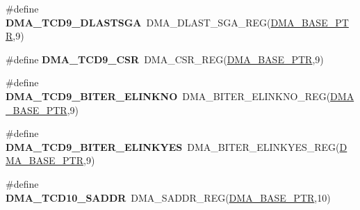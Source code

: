 \begin{DoxyCompactItemize}
\item 
\hypertarget{group___d_m_a___register___accessor___macros_ga0ec6976994ee346eac1875e848eb5468}{}\#define {\bfseries D\+M\+A\+\_\+\+T\+C\+D9\+\_\+\+D\+L\+A\+S\+T\+S\+G\+A}~D\+M\+A\+\_\+\+D\+L\+A\+S\+T\+\_\+\+S\+G\+A\+\_\+\+R\+E\+G(\hyperlink{group___d_m_a___peripheral_ga6997fbc1b1973e9f27170217a3bd6f22}{D\+M\+A\+\_\+\+B\+A\+S\+E\+\_\+\+P\+T\+R},9)\label{group___d_m_a___register___accessor___macros_ga0ec6976994ee346eac1875e848eb5468}

\item 
\hypertarget{group___d_m_a___register___accessor___macros_ga749263dc7d3a0d1a02d6446098555380}{}\#define {\bfseries D\+M\+A\+\_\+\+T\+C\+D9\+\_\+\+C\+S\+R}~D\+M\+A\+\_\+\+C\+S\+R\+\_\+\+R\+E\+G(\hyperlink{group___d_m_a___peripheral_ga6997fbc1b1973e9f27170217a3bd6f22}{D\+M\+A\+\_\+\+B\+A\+S\+E\+\_\+\+P\+T\+R},9)\label{group___d_m_a___register___accessor___macros_ga749263dc7d3a0d1a02d6446098555380}

\item 
\hypertarget{group___d_m_a___register___accessor___macros_gad23dc537bb2e195e067b8e949e20f7ed}{}\#define {\bfseries D\+M\+A\+\_\+\+T\+C\+D9\+\_\+\+B\+I\+T\+E\+R\+\_\+\+E\+L\+I\+N\+K\+N\+O}~D\+M\+A\+\_\+\+B\+I\+T\+E\+R\+\_\+\+E\+L\+I\+N\+K\+N\+O\+\_\+\+R\+E\+G(\hyperlink{group___d_m_a___peripheral_ga6997fbc1b1973e9f27170217a3bd6f22}{D\+M\+A\+\_\+\+B\+A\+S\+E\+\_\+\+P\+T\+R},9)\label{group___d_m_a___register___accessor___macros_gad23dc537bb2e195e067b8e949e20f7ed}

\item 
\hypertarget{group___d_m_a___register___accessor___macros_ga256aa9d7f919cfb32f87d4e828ed7771}{}\#define {\bfseries D\+M\+A\+\_\+\+T\+C\+D9\+\_\+\+B\+I\+T\+E\+R\+\_\+\+E\+L\+I\+N\+K\+Y\+E\+S}~D\+M\+A\+\_\+\+B\+I\+T\+E\+R\+\_\+\+E\+L\+I\+N\+K\+Y\+E\+S\+\_\+\+R\+E\+G(\hyperlink{group___d_m_a___peripheral_ga6997fbc1b1973e9f27170217a3bd6f22}{D\+M\+A\+\_\+\+B\+A\+S\+E\+\_\+\+P\+T\+R},9)\label{group___d_m_a___register___accessor___macros_ga256aa9d7f919cfb32f87d4e828ed7771}

\item 
\hypertarget{group___d_m_a___register___accessor___macros_ga43def64208954cf8918f00a5c2e8a5c3}{}\#define {\bfseries D\+M\+A\+\_\+\+T\+C\+D10\+\_\+\+S\+A\+D\+D\+R}~D\+M\+A\+\_\+\+S\+A\+D\+D\+R\+\_\+\+R\+E\+G(\hyperlink{group___d_m_a___peripheral_ga6997fbc1b1973e9f27170217a3bd6f22}{D\+M\+A\+\_\+\+B\+A\+S\+E\+\_\+\+P\+T\+R},10)\label{group___d_m_a___register___accessor___macros_ga43def64208954cf8918f00a5c2e8a5c3}


\end{DoxyCompactItemize}
